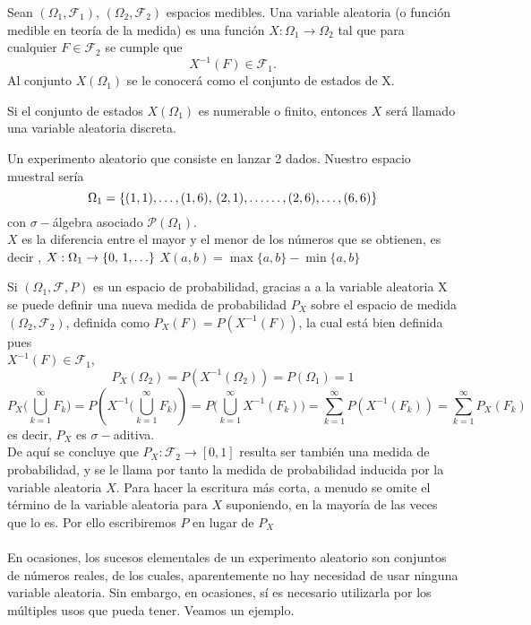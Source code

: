\begin{Def}
    Sean $(\Omega_1,\mathscr{F}_1)$, $(\Omega_2,\mathscr{F}_2)$ espacios medibles. Una variable aleatoria (o función medible en teoría de la medida) es una función $X:\Omega_1\rightarrow \Omega_2$ tal que para cualquier $F\in\mathscr{F}_2$ se cumple que $$X^{-1}(F)\in\mathscr{F}_1.$$
    Al conjunto $X(\Omega_1)$ se le conocerá como el conjunto de estados de X.
\end{Def}
\begin{Obs}
    Si el conjunto de estados $X(\Omega_1)$ es numerable o finito, entonces $X$ será llamado una variable aleatoria discreta.
\end{Obs}
\begin{Ejm}
    Un experimento aleatorio que consiste en lanzar 2 dados. Nuestro espacio muestral sería $$\Omega_1=\{(1,1),\ldots,(1,6),\thinspace(2,1),\ldots\ldots,(2,6),\ldots,(6,6)\}$$ con $\sigma-$álgebra asociado $\mathscr{P}(\Omega_1)$.\\ $X$ es la diferencia entre el mayor y el menor de los números que se obtienen, es decir , $X:\Omega_1\rightarrow \{0,\thinspace 1,\ldots\}$ $X(a,b)=\max \{a,b\}-\min\{a,b\}$
\end{Ejm}
Si $(\Omega_1,\mathscr{F},P)$ es un espacio de probabilidad, gracias a a la variable aleatoria X se puede definir una nueva medida de probabilidad $P_X$ sobre el espacio de medida $(\Omega_2,\mathscr{F}_2)$, definida como $P_X(F)=P(X^{-1}(F))$, la cual está bien definida pues \\$X^{-1}(F)\in\mathscr{F}_1$,  $$P_X(\Omega_2)=P(X^{-1}(\Omega_2))=P(\Omega_1)=1$$ $$P_X\big(\bigcup_{k=1}^\infty F_k\big)=P(X^{-1}\big(\bigcup_{k=1}^\infty
F_k\big))=P \big(\bigcup_{k=1}^\infty X^{-1}(F_k) \big)=\sum_{k=1}^\infty P(X^{-1}(F_k))=\sum_{k=1}^\infty P_X(F_k)$$
es decir, $P_X$ es $\sigma-$aditiva.\\
De aquí se concluye que $P_X:\mathscr{F_2}\rightarrow [0,1]$ resulta ser también una medida de probabilidad, y se le llama por tanto la medida de probabilidad inducida por la variable aleatoria $X$. Para hacer la escritura más corta, a menudo se omite el término de la variable aleatoria para $X$ suponiendo, en la mayoría de las veces que lo es. Por ello escribiremos $P$ en lugar de $P_X$\\\\
En ocasiones, los sucesos elementales de un experimento aleatorio son conjuntos de números reales, de los cuales, aparentemente no hay necesidad de usar ninguna variable aleatoria. Sin embargo, en ocasiones, sí es necesario utilizarla por los múltiples usos que pueda tener. Veamos un ejemplo.
